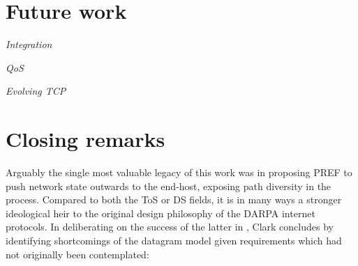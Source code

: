 %
%
 
\section{Future work}

\LOREM

\textit{Integration}
\LOREM

\textit{\ac{QoS}}
\LOREM

\textit{Evolving \ac{TCP}}
\LOREM
\LOREM

\section{Closing remarks}
Arguably the single most valuable legacy of this work was in proposing \acl{PREF} to push network state outwards to the end-host, exposing path diversity in the process.
Compared to both the \ac{ToS} or \ac{DS} fields, it is in many ways a stronger ideological heir to the original design philosophy of the \acs{DARPA} internet protocols.
In deliberating on the success of the latter in \cite{Clark:1988p478}, Clark concludes by identifying shortcomings of the datagram model given requirements which had not originally been contemplated:


